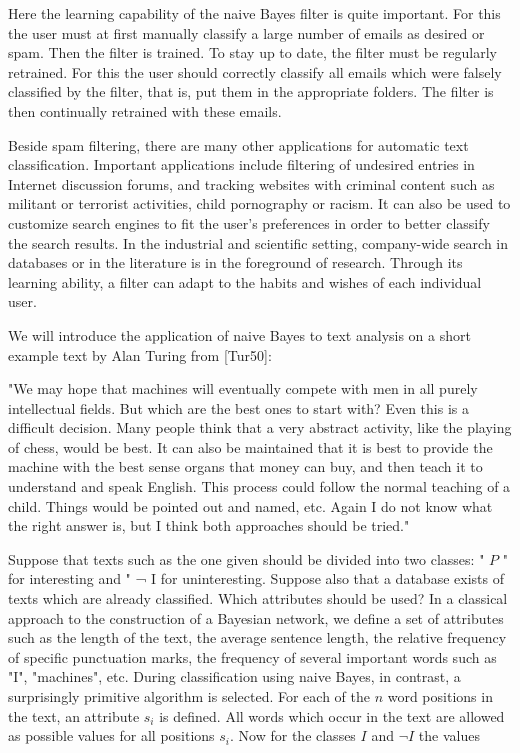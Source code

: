 \documentclass[10pt]{article}
\begin{document}
Here the learning capability of the naive Bayes filter is quite important. For this the user must at first manually classify a large number of emails as desired or spam. Then the filter is trained. To stay up to date, the filter must be regularly retrained. For this the user should correctly classify all emails which were falsely classified by the filter, that is, put them in the appropriate folders. The filter is then continually retrained with these emails.

Beside spam filtering, there are many other applications for automatic text classification. Important applications include filtering of undesired entries in Internet discussion forums, and tracking websites with criminal content such as militant or terrorist activities, child pornography or racism. It can also be used to customize search engines to fit the user's preferences in order to better classify the search results. In the industrial and scientific setting, company-wide search in databases or in the literature is in the foreground of research. Through its learning ability, a filter can adapt to the habits and wishes of each individual user.

We will introduce the application of naive Bayes to text analysis on a short example text by Alan Turing from [Tur50]:

\begin{displayquote}
"We may hope that machines will eventually compete with men in all purely intellectual fields. But which are the best ones to start with? Even this is a difficult decision. Many people think that a very abstract activity, like the playing of chess, would be best. It can also be maintained that it is best to provide the machine with the best sense organs that money can buy, and then teach it to understand and speak English. This process could follow the normal teaching of a child. Things would be pointed out and named, etc. Again I do not know what the right answer is, but I think both approaches should be tried."
\end{displayquote}

Suppose that texts such as the one given should be divided into two classes: " $P$ " for interesting and " ¬ I for uninteresting. Suppose also that a database exists of texts which are already classified. Which attributes should be used? In a classical approach to the construction of a Bayesian network, we define a set of attributes such as the length of the text, the average sentence length, the relative frequency of specific punctuation marks, the frequency of several important words such as "I", "machines", etc. During classification using naive Bayes, in contrast, a surprisingly primitive algorithm is selected. For each of the $n$ word positions in the text, an attribute $s_{i}$ is defined. All words which occur in the text are allowed as possible values for all positions $s_{i}$. Now for the classes $I$ and $\neg I$ the values
\end{document}
